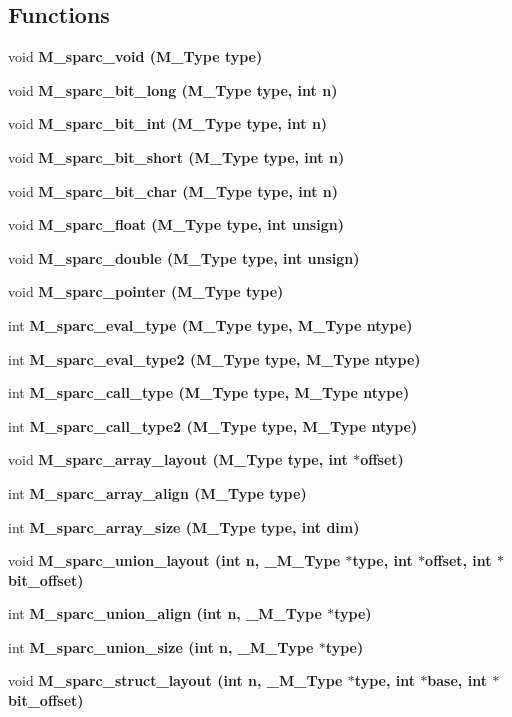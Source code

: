 \subsection*{Functions}
\begin{CompactItemize}
\item 
void \bf{M\_\-sparc\_\-void} (\bf{M\_\-Type} type)
\item 
void \bf{M\_\-sparc\_\-bit\_\-long} (\bf{M\_\-Type} type, int n)
\item 
void \bf{M\_\-sparc\_\-bit\_\-int} (\bf{M\_\-Type} type, int n)
\item 
void \bf{M\_\-sparc\_\-bit\_\-short} (\bf{M\_\-Type} type, int n)
\item 
void \bf{M\_\-sparc\_\-bit\_\-char} (\bf{M\_\-Type} type, int n)
\item 
void \bf{M\_\-sparc\_\-float} (\bf{M\_\-Type} type, int unsign)
\item 
void \bf{M\_\-sparc\_\-double} (\bf{M\_\-Type} type, int unsign)
\item 
void \bf{M\_\-sparc\_\-pointer} (\bf{M\_\-Type} type)
\item 
int \bf{M\_\-sparc\_\-eval\_\-type} (\bf{M\_\-Type} type, \bf{M\_\-Type} ntype)
\item 
int \bf{M\_\-sparc\_\-eval\_\-type2} (\bf{M\_\-Type} type, \bf{M\_\-Type} ntype)
\item 
int \bf{M\_\-sparc\_\-call\_\-type} (\bf{M\_\-Type} type, \bf{M\_\-Type} ntype)
\item 
int \bf{M\_\-sparc\_\-call\_\-type2} (\bf{M\_\-Type} type, \bf{M\_\-Type} ntype)
\item 
void \bf{M\_\-sparc\_\-array\_\-layout} (\bf{M\_\-Type} type, int $\ast$offset)
\item 
int \bf{M\_\-sparc\_\-array\_\-align} (\bf{M\_\-Type} type)
\item 
int \bf{M\_\-sparc\_\-array\_\-size} (\bf{M\_\-Type} type, int dim)
\item 
void \bf{M\_\-sparc\_\-union\_\-layout} (int n, \bf{\_\-M\_\-Type} $\ast$type, int $\ast$offset, int $\ast$bit\_\-offset)
\item 
int \bf{M\_\-sparc\_\-union\_\-align} (int n, \bf{\_\-M\_\-Type} $\ast$type)
\item 
int \bf{M\_\-sparc\_\-union\_\-size} (int n, \bf{\_\-M\_\-Type} $\ast$type)
\item 
void \bf{M\_\-sparc\_\-struct\_\-layout} (int n, \bf{\_\-M\_\-Type} $\ast$type, int $\ast$base, int $\ast$bit\_\-offset)
\item 

\end{CompactItemize}
